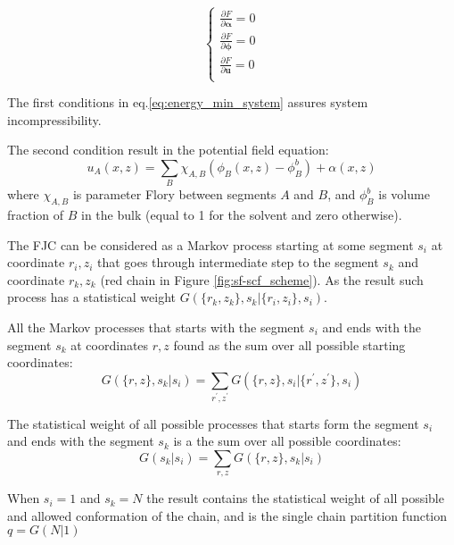 \documentclass[12pt, a4paper]{article}
\begin{document}
\begin{equation}
    \label{eq:energy_min_system}
    \begin{cases}
    \frac{\partial F}{\partial \boldsymbol{\alpha}} = 0 \\
    \frac{\partial F}{\partial \boldsymbol{\phi}} = 0 \\
        \frac{\partial F}{\partial \mathbf{u}} = 0 \\
    \end{cases}
\end{equation}

The first conditions in eq.\ref{eq:energy_min_system} assures system incompressibility.

The second condition result in the potential field equation:
\begin{equation}
    \label{eq:u-phi}
    u_A(x, z) =\sum\limits_{B} \chi_{A,B} \left(\phi_B(x,z) - \phi_B^b \right) + \alpha(x, z)
\end{equation}
where $\chi_{A,B}$ is parameter Flory between segments $A$ and $B$, and $\phi_B^b$ is volume fraction of $B$ in the bulk (equal to 1 for the solvent and zero otherwise).

The FJC can be considered as a Markov process starting at some segment $s_{i}$ at coordinate $r_{i}, z_{i}$ that goes through intermediate step to the segment $s_{k}$ and coordinate $r_{k}, z_{k}$ (red chain in Figure \ref{fig:sf-scf_scheme}).
As the result such process has a statistical weight $G(\{r_{k}, z_{k}\}, s_{k} | \{r_{i}, z_{i}\}, s_{i})$.

All the Markov processes that starts with the segment $s_{i}$ and ends with the segment $s_{k}$ at coordinates ${r, z}$ found as the sum over all possible starting coordinates:
\begin{equation}
    G(\{r, z\}, s_{k} | s_{i}) = \sum_{r^{\prime}, z^{\prime}} G(\{r, z\}, s_{i} | \{r^{\prime}, z^{\prime}\}, s_{i})
\end{equation}

The statistical weight of all possible processes that starts form the segment $s_{i}$ and ends with the segment $s_{k}$ is a the sum over all possible coordinates:
\begin{equation}
    G(s_{k} | s_{i}) = \sum_{r, z} G(\{r, z\}, s_{k} | s_{i})
\end{equation}

When $s_{i}=1$ and $s_{k}=N$ the result contains the statistical weight of all possible and allowed conformation of the chain, and is the single chain partition function $q = G(N|1)$
\end{document}
